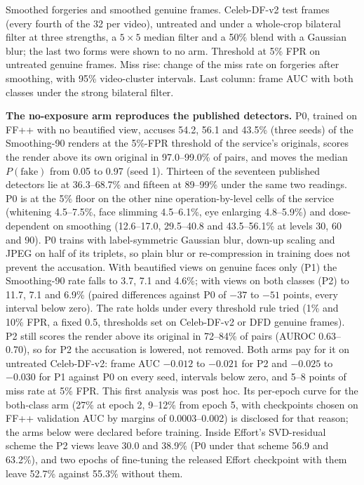 \documentclass[10pt]{article}
\begin{document}
\begin{table}[H]
\centering
\caption{Smoothed forgeries and smoothed genuine frames. Celeb-DF-v2 test frames (every fourth of the 32 per video),
untreated and under a whole-crop bilateral filter at three strengths, a $5\times5$ median filter and a 50\% blend with
a Gaussian blur; the last two forms were shown to no arm. Threshold at 5\% FPR on untreated genuine frames. Miss rise:
change of the miss rate on forgeries after smoothing, with 95\% video-cluster intervals. Last column: frame AUC with
both classes under the strong bilateral filter.}
\label{tab:v4evasion}
\scriptsize
\begin{adjustbox}{max width=\linewidth}\end{adjustbox}
\end{table}

\textbf{The no-exposure arm reproduces the published detectors.} P0, trained on FF++ with no beautified view,
accuses 54.2, 56.1 and 43.5\% (three seeds) of the Smoothing-90 renders at the 5\%-FPR threshold of the service's
originals, scores the render above its own original in 97.0--99.0\% of pairs, and moves the median $P(\text{fake})$ from
0.05 to 0.97 (seed 1). Thirteen of the seventeen published detectors lie at 36.3--68.7\% and fifteen at 89--99\% under
the same two readings. P0 is at the 5\% floor on the other nine operation-by-level cells of the service
(whitening 4.5--7.5\%, face slimming 4.5--6.1\%, eye enlarging 4.8--5.9\%) and dose-dependent on smoothing
(12.6--17.0, 29.5--40.8 and 43.5--56.1\% at levels 30, 60 and 90). P0 trains with label-symmetric Gaussian blur,
down-up scaling and JPEG on half of its triplets, so plain blur or re-compression in training does not prevent the
accusation. With beautified views on genuine faces only (P1) the Smoothing-90 rate falls to 3.7, 7.1 and 4.6\%; with
views on both classes (P2) to 11.7, 7.1 and 6.9\% (paired differences against P0 of $-37$ to $-51$ points, every
interval below zero). The rate holds under every threshold rule tried (1\% and 10\% FPR, a fixed 0.5, thresholds set on
Celeb-DF-v2 or DFD genuine frames). P2 still scores the render above its original in 72--84\% of pairs (AUROC
0.63--0.70), so for P2 the accusation is lowered, not removed. Both arms pay for it on untreated Celeb-DF-v2: frame AUC
$-0.012$ to $-0.021$ for P2 and $-0.025$ to $-0.030$ for P1 against P0 on every seed, intervals below zero, and 5--8
points of miss rate at 5\% FPR. This first analysis was post hoc. Its per-epoch curve for the both-class arm (27\% at
epoch 2, 9--12\% from epoch 5, with checkpoints chosen on FF++ validation AUC by margins of 0.0003--0.002) is disclosed
for that reason; the arms below were declared before training. Inside Effort's SVD-residual scheme the P2 views leave
30.0 and 38.9\% (P0 under that scheme 56.9 and 63.2\%), and two epochs of fine-tuning the released Effort checkpoint
with them leave 52.7\% against 55.3\% without them.
\end{document}
